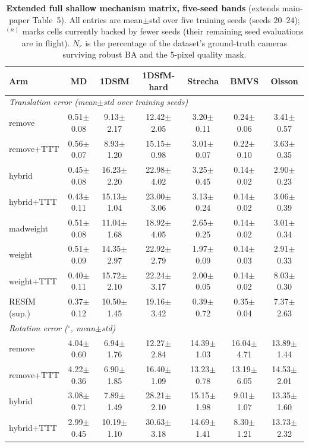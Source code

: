 \documentclass[10pt,twocolumn,letterpaper]{article}
\renewcommand{\deg}{^{\circ}}
\begin{document}
\begin{table}[t]\centering\footnotesize
\caption{\textbf{Extended full shallow mechanism matrix, five-seed bands} (extends
main-paper Table~5). All entries are mean$\pm$std over five training seeds
(seeds $20$--$24$); $^{(n)}$ marks cells currently backed by fewer seeds (their
remaining seed evaluations are in flight). $N_r$ is the percentage of the dataset's
ground-truth cameras surviving robust BA and the 5-pixel quality mask.}
\label{tab:x_matrix}
\setlength{\tabcolsep}{3pt}%
\begin{tabular}{lcccccc}
\toprule
Arm & MD & 1DSfM & 1DSfM-hard & Strecha & BMVS & Olsson\\
\midrule
\multicolumn{7}{l}{\emph{Translation error (mean$\pm$std over training seeds)}}\\[1pt]
remove & 0.51$\pm$0.08 & 9.13$\pm$2.17 & 12.42$\pm$2.05 & 3.20$\pm$0.11 & 0.24$\pm$0.06 & 3.41$\pm$0.57\\
remove+TTT & 0.56$\pm$0.07 & 8.93$\pm$1.20 & 15.15$\pm$0.98 & 3.01$\pm$0.07 & 0.22$\pm$0.10 & 3.63$\pm$0.35\\
hybrid & 0.45$\pm$0.08 & 16.23$\pm$2.20 & 22.98$\pm$4.02 & 3.25$\pm$0.45 & 0.14$\pm$0.02 & 2.90$\pm$0.23\\
hybrid+TTT & 0.43$\pm$0.11 & 15.13$\pm$1.04 & 23.00$\pm$3.06 & 3.13$\pm$0.24 & 0.14$\pm$0.02 & 3.06$\pm$0.39\\
madweight & 0.51$\pm$0.08 & 11.04$\pm$1.68 & 18.92$\pm$4.05 & 2.65$\pm$0.25 & 0.14$\pm$0.02 & 3.01$\pm$0.34\\
weight & 0.51$\pm$0.09 & 14.35$\pm$2.97 & 22.92$\pm$2.79 & 1.97$\pm$0.09 & 0.14$\pm$0.03 & 2.91$\pm$0.33\\
weight+TTT & 0.40$\pm$0.11 & 15.72$\pm$2.10 & 22.24$\pm$3.17 & 2.00$\pm$0.05 & 0.14$\pm$0.02 & 8.03$\pm$0.30\\
RESfM (sup.) & 0.37$\pm$0.12 & 10.50$\pm$1.45 & 19.16$\pm$3.42 & 0.39$\pm$0.72 & 0.35$\pm$0.04 & 7.37$\pm$2.63\\
\midrule
\multicolumn{7}{l}{\emph{Rotation error ($\deg$, mean$\pm$std)}}\\[1pt]
remove & 4.04$\pm$0.60 & 6.94$\pm$1.76 & 12.27$\pm$2.84 & 14.39$\pm$1.03 & 16.04$\pm$4.71 & 13.89$\pm$1.44\\
remove+TTT & 4.22$\pm$0.36 & 6.90$\pm$1.85 & 16.40$\pm$1.09 & 13.23$\pm$0.78 & 13.19$\pm$6.05 & 14.53$\pm$2.01\\
hybrid & 3.08$\pm$0.71 & 7.89$\pm$1.49 & 28.21$\pm$2.10 & 15.15$\pm$1.98 & 9.01$\pm$1.07 & 13.35$\pm$1.60\\
hybrid+TTT & 2.99$\pm$0.45 & 10.19$\pm$1.10 & 30.63$\pm$3.18 & 14.69$\pm$1.41 & 8.30$\pm$1.21 & 13.73$\pm$2.32\\

\end{tabular}
\end{table}
\end{document}
